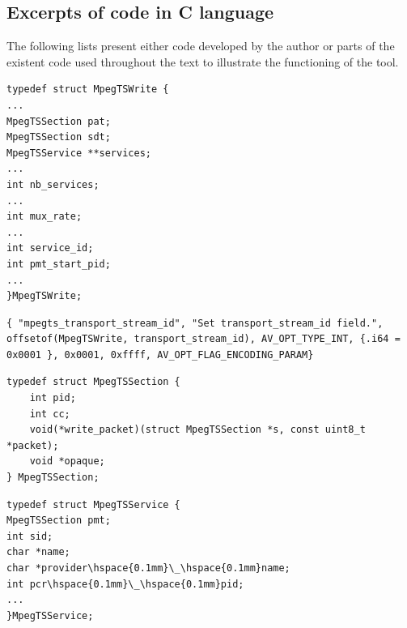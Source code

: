 \documentclass[
	12pt,				%
	openright,			%
	twoside,			%
	a4paper,			%
	brazil,
	french,				%
	english
	]{abntex2}
\begin{document}
\begin{apendicesenv}
\chapter{Excerpts of code in C language}

The following lists present either code developed by the author or parts of the existent code used throughout the text to illustrate the functioning of the tool.

\begin{minipage}{\linewidth}
\begin{lstlisting}[caption={Excerpt of MpegTSWrite structure}, label={lst_MpegTSWrite}]
typedef struct MpegTSWrite {
...
MpegTSSection pat;
MpegTSSection sdt;
MpegTSService **services;
...
int nb_services;
...
int mux_rate;
...
int service_id;
int pmt_start_pid;
...
}MpegTSWrite;
\end{lstlisting}
\end{minipage}

\begin{minipage}{\linewidth}
\begin{lstlisting}[caption={Example of input option}, label=lst_input_option]
{ "mpegts_transport_stream_id", "Set transport_stream_id field.", offsetof(MpegTSWrite, transport_stream_id), AV_OPT_TYPE_INT, {.i64 = 0x0001 }, 0x0001, 0xffff, AV_OPT_FLAG_ENCODING_PARAM}
\end{lstlisting}
\end{minipage}

\begin{minipage}{\linewidth}
\begin{lstlisting}[caption={Excerpt of MpegTSSection structure}, label=lst_MpegTSSection]
typedef struct MpegTSSection {
	int pid;
	int cc;
	void(*write_packet)(struct MpegTSSection *s, const uint8_t *packet);
	void *opaque;
} MpegTSSection;
\end{lstlisting}
\end{minipage}

\begin{minipage}{\linewidth}
\begin{lstlisting}[caption={Excerpt of MpegTSService structure}, label=lst_MpegTSService]
typedef struct MpegTSService {
MpegTSSection pmt; 
int sid; 
char *name;
char *provider\hspace{0.1mm}\_\hspace{0.1mm}name;
int pcr\hspace{0.1mm}\_\hspace{0.1mm}pid;
...
}MpegTSService;
\end{lstlisting}
\end{minipage}


\end{apendicesenv}
\end{document}
